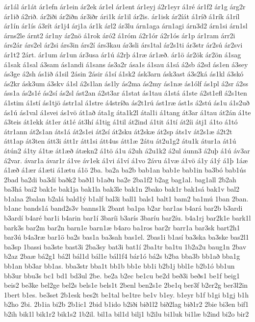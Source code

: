 {ár1ál
ár1át
ár1efn
ár1ein
ár2ek
ár1el
ár1ent
ár1eyj
á2r1eyr
á1ré
ár1f2
ár1g
árg2r
ár1ið
á2rið.
ár2iði
ár2iðn
ár3iðr
ári1k
ár1il
ár2is.
ár1isk
ár2íát
á1ríð
á1rík
á1ríl
ár1ín
ár1ís
á3rít
ár1j4
árj1a
ár1k
árl2
ár3lu
árn1aga
árn1agi
árn3d2
árn1si
árn1sl
árns2le
árnt2
ár1ny
ár2nö
á1rok
áró2
á1róm
á2r1ór
á2r1ós
ár1p
ár1ram
árr2i
árs2ár
árs2el
ár2si
árs3in
árs2í
árs3kau
ár3sli
árs1tal
ár2s1ti
ár3str
ár2sú
ár2svi
ár1t2
2árt.
ár1um
ár1un
ár3usa
ár1ú
á2rþ
á1ræ
ár1æð.
ár1ö
ár2ök
ár2ön
á1sag
á1sak
á1sal
á3sam
ás1andi
á1sans
ás3a2r
ása1s
á1sau
á1sá
á2sb
á2sd
ás1en
á3sey
ás3ge
á2sh
ás1ið
á1sil
2ásin
2ásir
á1sí
á1sk2
ásk3arn
ásk3ast
á3s2ká
ás1kl
á3skó
ás2kr
ásk3um
á3skv
á1sl
á2s1lan
ás1ly
ás2ma
ás2my
ás1næ
ás1ólf
ás1pl
á2sr
á2ss
áss1a
ás2s1é
ás2sí
ás2sl
ást2an
á2st3ar
á1stat
ás1tau
á1stá
á1ste
á2st1efl
á2s1ten
á1stim
á1stí
ás1tjö
ástr1al
á1stre
á4stríða
ás2t1rú
ást1ræ
ást1s
á2stú
ás1u
á1s2uð
ás1ú
ás1val
á1svei
ás1vö
át1að
áta1g
áta1k2l
átal1i
á1tang
át3ar
á1tau
át2án
á1te
á3teis
át1ekk
át1er
át1é
át3hí
á1tig
á1til
át2ind
á1tit
á1tí
át2íi
átj1
á1to
á1tó
átr1ann
át2s1an
áts1á
át2s1ei
át2sí
át2sku
át2skæ
át2sp
áts1v
át2s1æ
á2t2t
átt1ap
át3ten
átt3i
átt1r
átt1si
átt4us
átt1æ
2átu
át2u1g2
átu1k
átur1a
át1ú
átún2
á1ty
á1tæ
át1æð
átækn2
á1tö
á1u
á2uh
á2u1k2
á2ul
áunn3
á2uþ
á1ú
áv3ar
á2var.
ávar1a
ávar1r
á1ve
áv1ek
á1vi
á1ví
á1vo
2ávu
á1væ
á1vö
á1y
á1ý
á1þ
1áæ
á1æð
á1ær
á1æti
á1ætu
á1ö
2ba.
ba2a
ba2b
bab1an
bab1e
bab1in
ba3bó
bab1ús
2bad
ba2di
ba3dí
baðk2
bað1l
b1aðu
ba2e
2ba1f2
b2ag
bag1al.
bag1all
2b2ah
ba3há
bai2
bak1e
bak1ja
bak1la
bak3le
bak1n
2bako
bak1r
bak1sá
bak1v
bal2
b1alaa
2balan
b2alá
bald1ý
b1alf
bal3i
ball1
bals1
balt1
bam2
ba1mú
1ban
2ban.
b1anc
bands1á
band2s3v
banns1k
2bant
ba1pa
b2ar
bar1as
b4ará
bar2b
b3ardi
b3ardí
b4aré
bar1i
b4arin
bar1í
3baríi
b3arís
3baríu
bar2íu.
b4a1rj
bar2k1e
bark1l
bark3s
bar2m
bar2n
barn1e
barn1æ
b4aro
ba1ros
bar2r
barr1a
bar3sk
bart2h1
bar3ú
b4a3ræ
bar1ö
ba2s
bas1a
ba3sah
bas1el.
2bas1i
b1así
ba3ska
ba3ske
bas2l1
ba3sp
1bassi
ba3ste
bast3i
2ba3sy
bat3i
bat1í
2ba1tr
ba1tu
1b2a2u
baug1n
2bav
b2az
2baæ
bá2g1
bá2l
bál1d
bál1e
bál1f4
bár1ó
bá2s
b2ba
bba3b
bb1að
bba1g
bb1an
bb3ar
bb1as.
bba3str
bba1t
bb1b
bb1e
bb1i
b2b1j
bbl1e
b2b1ó
bb1un
bb3ur
bbu3s
bc1
bd1
bd3ul
2be.
be2a
b2ec
be1cu
be2d
beð3i
beðs1
be1f
beig1
beis2
be3ke
bel2ge
bel2s
bels1e
bels1t
2benl
ben2s1e
2be1q
ber3f
b2er2g
ber3l2in
1bert
b1es.
be3set
2b1esk
bes2t
be1tal
be1tre
be1v
b1ey.
b1eyr
b1f
b1gi
b1gj
b1h
b2ho
2bi.
2b1ia
bi2b
2b1ic1
2bid
b1ido
b2iði
bið1l2
bið2lag
bið1r2
2bie
bi3en
bif1
b2ih
bik1l
bik1r2
bik1s2
1b2il.
bil1a
bil1d
bilj1
b2ilu
bi1luk
bi1læ
b2ind
bi2o
bir2
}
